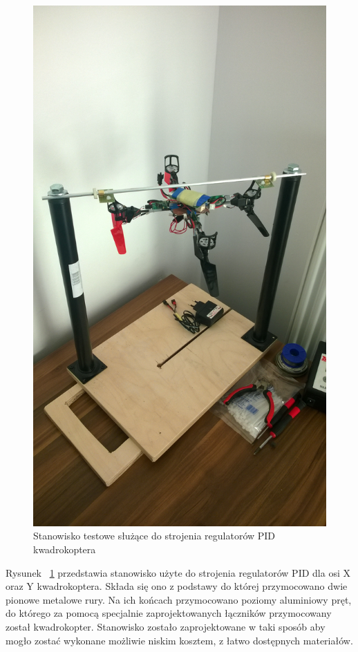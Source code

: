 \begin{figure}[H]
	\centering
	\includegraphics[scale=0.15]{Pictures/QuadroTestStation.jpg}
	\caption[Stanowisko testowe służące do strojenia regulatorów PID kwadrokoptera]{Stanowisko testowe służące do strojenia regulatorów PID kwadrokoptera}
	\label{fig:QuadroTestStation}
\end{figure}

Rysunek ~\ref{fig:QuadroTestStation} przedstawia stanowisko użyte do strojenia regulatorów PID dla osi X oraz Y kwadrokoptera. Składa się ono z podstawy do której przymocowano dwie pionowe metalowe rury. Na ich końcach przymocowano poziomy aluminiowy pręt, do którego za pomocą specjalnie zaprojektowanych łączników przymocowany został kwadrokopter. Stanowisko zostało zaprojektowane w taki sposób aby mogło zostać wykonane możliwie niskim kosztem, z łatwo dostępnych materiałów.  

